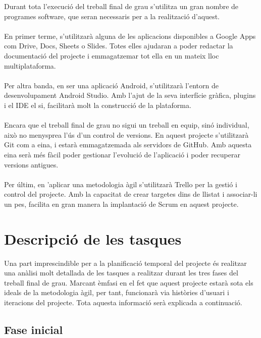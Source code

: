 Durant tota l’execució del treball final de grau s’utilitza un gran nombre de programes software, que seran necessaris per a la realització d’aquest.
\\\\
En primer terme, s’utilitzarà alguna de les aplicacions disponibles a Google Apps\cite{gsuite} com Drive, Docs, Sheets o Slides. Totes elles ajudaran a poder redactar la documentació del projecte i emmagatzemar tot ella en un mateix lloc multiplataforma.
\\\\
Per altra banda, en ser una aplicació Android, s’utilitzarà l’entorn de desenvolupament Android Studio\cite{androidstudio}. Amb l’ajut de la seva interfície gràfica, plugins i el IDE el si, facilitarà molt la construcció de la plataforma.
\\\\
Encara que el treball final de grau no sigui un treball en equip, sinó individual, això no menysprea l’ús d’un control de versions. En aquest projecte s’utilitzarà Git com a eina, i estarà emmagatzemada als servidors de GitHub\cite{github}. Amb aquesta eina serà més fàcil poder gestionar l’evolució de l’aplicació i poder recuperar versions antigues.
\\\\
Per últim, en ’aplicar una metodologia àgil s’utilitzarà Trello\cite{trello} per la gestió i control del projecte. Amb la capacitat de crear targetes dins de llistat i associar-li un pes, facilita en gran manera la implantació de Scrum en aquest projecte.


\section{Descripció de les tasques}

Una part imprescindible per a la planificació temporal del projecte és realitzar una anàlisi molt detallada de les tasques a realitzar durant les tres fases del treball final de grau. Marcant èmfasi en el fet que aquest projecte estarà sota els ideals de la metodologia àgil, per tant, funcionarà via històries d’usuari i iteracions del projecte. Tota aquesta informació serà explicada a continuació.

\subsection{Fase inicial}

